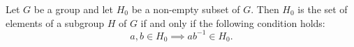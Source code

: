 Let $G$ be a group and let $H_0$ be a non-empty subset of $G$. Then $H_0$ is the set of elements of a subgroup $H$ of $G$ if and only if the following condition holds:
$$a, b \in H_0 \implies ab^{-1} \in H_0.$$
